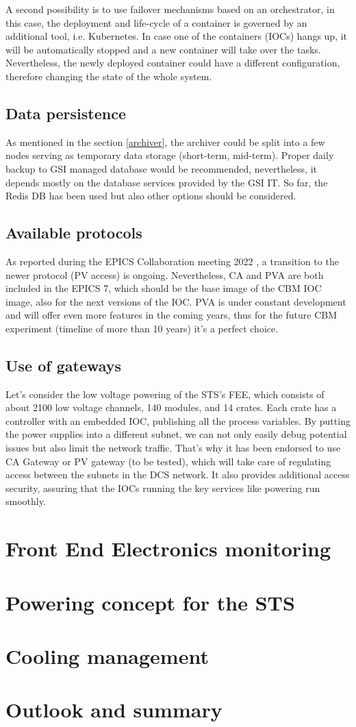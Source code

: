 A second possibility is to use failover mechanisms based on an orchestrator, in this case, the deployment and life-cycle of a container is governed by an additional tool, i.e. Kubernetes. In case one of the containers (IOCs) hangs up, it will be automatically stopped and a new container will take over the tasks. Nevertheless, the newly deployed container could have a different configuration, therefore changing the state of the whole system. 


\subsection{Data persistence}

As mentioned in the section \ref{archiver}, the archiver could be split into a few nodes serving as temporary data storage (short-term, mid-term). Proper daily backup to GSI managed database would be recommended, nevertheless, it depends mostly on the database services provided by the GSI IT. So far, the Redis DB has been used but also other options should be considered. 

\subsection{Available protocols}
As reported during the EPICS Collaboration meeting 2022 \cite{epics_2022}, a transition to the newer protocol (PV access) is ongoing. Nevertheless, CA and PVA are both included in the EPICS 7, which should be the base image of the CBM IOC image, also for the next versions of the IOC. PVA is under constant development and will offer even more features in the coming years, thus for the future CBM experiment (timeline of more than 10 years) it's a perfect choice. 

\subsection{Use of gateways}
Let's consider the low voltage powering of the STS's FEE, which consists of about 2100 low voltage channels, 140 modules, and 14 crates. Each crate has a controller with an embedded \gls{IOC}, publishing all the process variables. By putting the power supplies into a different subnet, we can not only easily debug potential issues but also limit the network traffic. That's why it has been endorsed to use CA Gateway \cite{gateway} or PV gateway (to be tested), which will take care of regulating access between the subnets in the DCS network. It also provides additional access security, assuring that the IOCs running the key services like powering run smoothly.

\section{Front End Electronics monitoring}
\section{Powering concept for the STS}
\section{Cooling management}
\section{Outlook and summary}